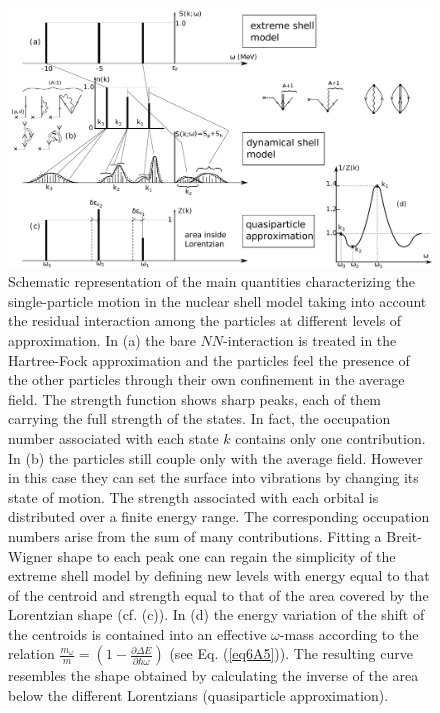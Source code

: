         \begin{figure}
        \centerline{\includegraphics*[width=15cm,angle=0]{C6/figs_C6/fig4I1.pdf}}
        	\caption{Schematic representation of the main quantities characterizing the single-particle motion in the nuclear shell model taking into account the residual interaction among the particles at different levels of approximation.
        	In (a) the bare $NN$-interaction is treated in the Hartree-Fock approximation and the particles feel the presence of the other particles through their own confinement in the average field. The strength function shows sharp peaks, each of them carrying the full strength of the states. In fact, the occupation number associated with each state $k$ contains only one contribution. In (b) the particles still couple   only  with the average field. However in this case they can set the surface into vibrations by changing its state of motion. The strength associated with each orbital is distributed over a finite energy range. The corresponding occupation numbers arise from the sum of many contributions. Fitting a Breit-Wigner  shape to each peak one can regain the simplicity of the extreme shell model by defining new levels with energy equal to that of the centroid and strength equal to that of the area covered by the Lorentzian shape (cf. (c)). In (d) the energy variation of the shift of the centroids is contained into an effective $\omega$-mass according to the relation $\frac{m_\omega}{m}=\left(1-\frac{\partial \Delta E}{\partial \hbar \omega}\right)$ (see Eq. (\ref{eq6A5})). The resulting curve resembles the shape obtained by calculating the inverse of the area below the different Lorentzians (quasiparticle approximation).}\label{fig8.F.1}
        \end{figure}


